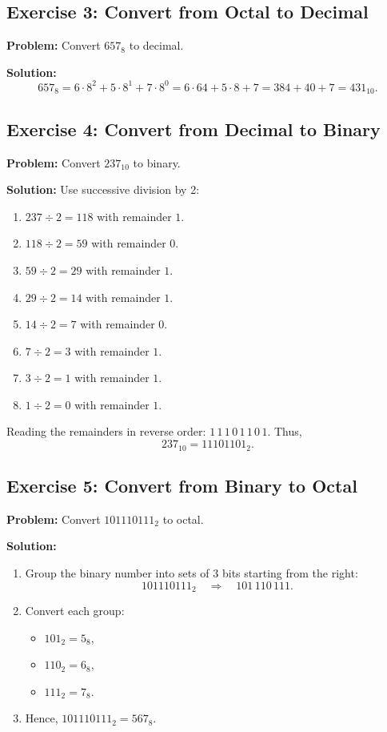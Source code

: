 \documentclass[12pt,a4paper]{article}
\begin{document}
\subsection{Exercise 3: Convert from Octal to Decimal}
\textbf{Problem:} Convert \(657_8\) to decimal.

\textbf{Solution:}
\[
657_8 = 6\cdot8^2 + 5\cdot8^1 + 7\cdot8^0 = 6\cdot64 + 5\cdot8 + 7 = 384 + 40 + 7 = 431_{10}.
\]

\subsection{Exercise 4: Convert from Decimal to Binary}
\textbf{Problem:} Convert \(237_{10}\) to binary.

\textbf{Solution:} Use successive division by 2:
\begin{enumerate}
    \item \(237 \div 2 = 118\) with remainder \(1\).
    \item \(118 \div 2 = 59\) with remainder \(0\).
    \item \(59 \div 2 = 29\) with remainder \(1\).
    \item \(29 \div 2 = 14\) with remainder \(1\).
    \item \(14 \div 2 = 7\) with remainder \(0\).
    \item \(7 \div 2 = 3\) with remainder \(1\).
    \item \(3 \div 2 = 1\) with remainder \(1\).
    \item \(1 \div 2 = 0\) with remainder \(1\).
\end{enumerate}
Reading the remainders in reverse order: \(1\,1\,1\,0\,1\,1\,0\,1\). Thus,
\[
237_{10} = 11101101_2.
\]

\subsection{Exercise 5: Convert from Binary to Octal}
\textbf{Problem:} Convert \(101110111_2\) to octal.

\textbf{Solution:}
\begin{enumerate}
    \item Group the binary number into sets of 3 bits starting from the right:
    \[
    101110111_2 \quad \Rightarrow \quad 101\,110\,111.
    \]
    \item Convert each group:
    \begin{itemize}
        \item \(101_2 = 5_8\),
        \item \(110_2 = 6_8\),
        \item \(111_2 = 7_8\).
    \end{itemize}
    \item Hence, \(101110111_2 = 567_8\).
\end{enumerate}
\end{document}
